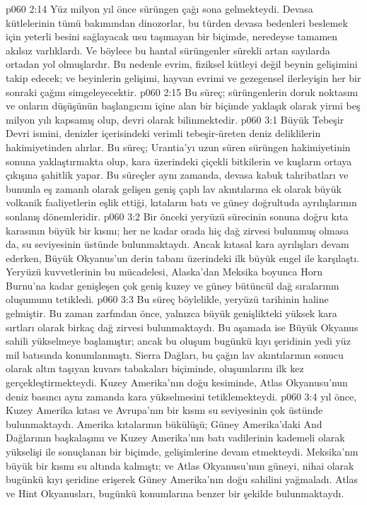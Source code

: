 \vs p060 2:14 Yüz milyon yıl önce sürüngen çağı sona gelmekteydi. Devasa kütlelerinin tümü bakımından dinozorlar, bu türden devasa bedenleri beslemek için yeterli besini sağlayacak usu taşımayan bir biçimde, neredeyse tamamen akılsız varlıklardı. Ve böylece bu hantal sürüngenler sürekli artan sayılarda ortadan yol olmuşlardır. Bu nedenle evrim, fiziksel kütleyi değil beynin gelişimini takip edecek; ve beyinlerin gelişimi, hayvan evrimi ve gezegensel ilerleyişin her bir sonraki çağını simgeleyecektir.
\vs p060 2:15 Bu süreç; sürüngenlerin doruk noktasını ve onların düşüşünün başlangıcını içine alan bir biçimde yaklaşık olarak yirmi beş milyon yılı kapsamış olup,  devri olarak bilinmektedir.
\vs p060 3:1 Büyük Tebeşir Devri ismini, denizler içerisindeki verimli tebeşir\hyp{}üreten deniz deliklilerin hakimiyetinden alırlar. Bu süreç; Urantia’yı uzun süren sürüngen hakimiyetinin sonuna yaklaştırmakta olup, kara üzerindeki çiçekli bitkilerin ve kuşların ortaya çıkışına şahitlik yapar. Bu süreçler aynı zamanda, devasa kabuk tahribatları ve bununla eş zamanlı olarak gelişen geniş çaplı lav akıntılarına ek olarak büyük volkanik faaliyetlerin eşlik ettiği, kıtaların batı ve güney doğrultuda ayrılışlarının sonlanış dönemleridir.
\vs p060 3:2 Bir önceki yeryüzü sürecinin sonuna doğru kıta karasının büyük bir kısmı; her ne kadar orada hiç dağ zirvesi bulunmuş olmasa da, su seviyesinin üstünde bulunmaktaydı. Ancak kıtasal kara ayrılışları devam ederken, Büyük Okyanus’un derin tabanı üzerindeki ilk büyük engel ile karşılaştı. Yeryüzü kuvvetlerinin bu mücadelesi, Alaska’dan Meksika boyunca Horn Burnu’na kadar genişleşen çok geniş kuzey ve güney bütüncül dağ sıralarının oluşumunu tetikledi.
\vs p060 3:3 Bu süreç böylelikle, yeryüzü tarihinin  haline gelmiştir. Bu zaman zarfından önce, yalnızca büyük genişlikteki yüksek kara sırtları olarak birkaç dağ zirvesi bulunmaktaydı. Bu aşamada ise Büyük Okyanus sahili yükselmeye başlamıştır; ancak bu oluşum bugünkü kıyı şeridinin yedi yüz mil batısında konumlanmıştı. Sierra Dağları, bu çağın lav akıntılarının sonucu olarak altın taşıyan kuvars tabakaları biçiminde, oluşumlarını ilk kez gerçekleştirmekteydi. Kuzey Amerika’nın doğu kesiminde, Atlas Okyanusu’nun deniz basıncı aynı zamanda kara yükselmesini tetiklemekteydi.
\vs p060 3:4  yıl önce, Kuzey Amerika kıtası ve Avrupa’nın bir kısmı su seviyesinin çok üstünde bulunmaktaydı. Amerika kıtalarının bükülüşü; Güney Amerika’daki And Dağlarının başkalaşımı ve Kuzey Amerika’nın batı vadilerinin kademeli olarak yükselişi ile sonuçlanan bir biçimde, gelişimlerine devam etmekteydi. Meksika’nın büyük bir kısmı su altında kalmıştı; ve Atlas Okyanusu’nun güneyi, nihai olarak bugünkü kıyı şeridine erişerek Güney Amerika’nın doğu sahilini yağmaladı. Atlas ve Hint Okyanusları, bugünkü konumlarına benzer bir şekilde bulunmaktaydı.
